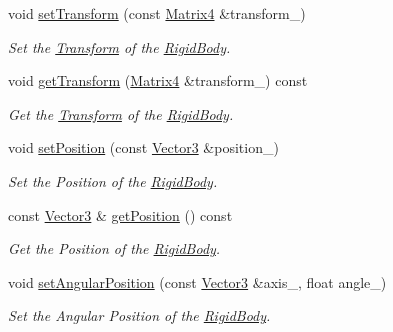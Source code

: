 \begin{DoxyCompactItemize}
\item 
void \hyperlink{class_magnum_1_1_physics3_1_1_vehicle_ab0bd5f0ffdaaba972447dddfd83c853f}{set\+Transform} (const \hyperlink{class_magnum_1_1_matrix4}{Matrix4} \&transform\+\_\+)
\begin{DoxyCompactList}\small\item\em Set the \hyperlink{class_magnum_1_1_transform}{Transform} of the \hyperlink{class_magnum_1_1_physics3_1_1_rigid_body}{Rigid\+Body}. \end{DoxyCompactList}\item 
void \hyperlink{class_magnum_1_1_physics3_1_1_vehicle_a4e7841e834c5fcbd4df04a96313bf209}{get\+Transform} (\hyperlink{class_magnum_1_1_matrix4}{Matrix4} \&transform\+\_\+) const 
\begin{DoxyCompactList}\small\item\em Get the \hyperlink{class_magnum_1_1_transform}{Transform} of the \hyperlink{class_magnum_1_1_physics3_1_1_rigid_body}{Rigid\+Body}. \end{DoxyCompactList}\item 
void \hyperlink{class_magnum_1_1_physics3_1_1_vehicle_afe5aaeca6605623cb8601734db7b2cfb}{set\+Position} (const \hyperlink{class_magnum_1_1_vector3}{Vector3} \&position\+\_\+)
\begin{DoxyCompactList}\small\item\em Set the Position of the \hyperlink{class_magnum_1_1_physics3_1_1_rigid_body}{Rigid\+Body}. \end{DoxyCompactList}\item 
const \hyperlink{class_magnum_1_1_vector3}{Vector3} \& \hyperlink{class_magnum_1_1_physics3_1_1_vehicle_a5e9d0136caef1017453016c16bb447bf}{get\+Position} () const 
\begin{DoxyCompactList}\small\item\em Get the Position of the \hyperlink{class_magnum_1_1_physics3_1_1_rigid_body}{Rigid\+Body}. \end{DoxyCompactList}\item 
void \hyperlink{class_magnum_1_1_physics3_1_1_vehicle_aca687f6797c723e45452c3048014aac1}{set\+Angular\+Position} (const \hyperlink{class_magnum_1_1_vector3}{Vector3} \&axis\+\_\+, float angle\+\_\+)
\begin{DoxyCompactList}\small\item\em Set the Angular Position of the \hyperlink{class_magnum_1_1_physics3_1_1_rigid_body}{Rigid\+Body}. \end{DoxyCompactList}\item 

\end{DoxyCompactItemize}
